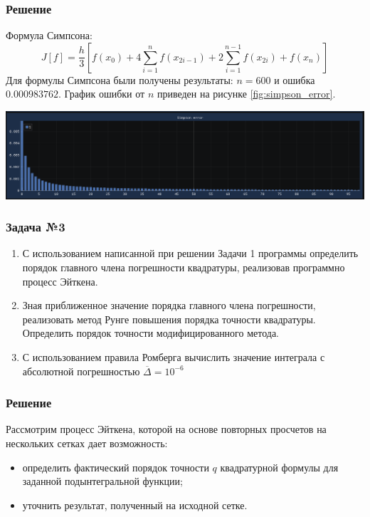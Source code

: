 \documentclass[a4paper, fontsize=14pt]{article}
\begin{document}
\subsubsection*{Решение}
    Формула Симпсона:
    \begin{equation*}
        J[f] = \frac{h}{3} \left[f(x_0) + 4 \sum_{i=1}^n f(x_{2i-1}) + 2 \sum_{i=1}^{n-1} f(x_{2i}) + f(x_n) \right]
    \end{equation*}
    Для формулы Симпсона были получены результаты: $n = 600$ и ошибка $0.000983762$.
    График ошибки от $n$ приведен на рисунке \ref{fig:simpson_error}.
    \begin{center}
        \includegraphics[scale=0.6]{src/simpson_error.png}
        \label{fig:simpson_error}
    \end{center}
\subsubsection*{Задача №3}
\begin{enumerate}
    \item С использованием написанной при решении Задачи 1 программы
определить порядок главного члена погрешности квадратуры,
реализовав программно процесс Эйткена.
    \item Зная приближенное значение порядка главного члена погрешности,
    реализовать метод Рунге повышения порядка точности квадратуры.
    Определить порядок точности модифицированного метода.
    \item С использованием правила Ромберга вычислить значение интеграла с
    абсолютной погрешностью $\overline{\Delta} = 10^{-6}$
\end{enumerate}
\subsubsection*{Решение}
Рассмотрим процесс Эйткена, которой на основе повторных просчетов на нескольких сетках дает возможность:
\begin{itemize}
    \item определить фактический порядок точности $q$ квадратурной формулы для заданной подынтегральной функции;
    \item уточнить результат, полученный на исходной сетке.
\end{itemize}
\end{document}
